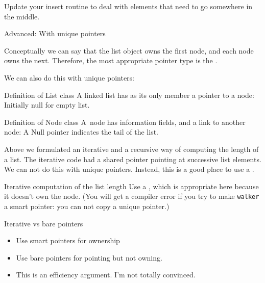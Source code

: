 \begin{exercise}
  \label{ex:linklist-insert-middle}
  Update your insert routine to deal with elements
  that need to go somewhere in the middle.
  
\end{exercise}


 {Advanced: With unique pointers}

Conceptually we can say
that the list object owns the first node, and each node owns the
next.
Therefore, the most appropriate pointer type is  the .

We can also do this with unique pointers:

\begin{block}{Definition of List class}
  \label{sl:list-class-u}
  A linked list has as its only member a pointer to a node:
  \lstset{numbers=left,numberstyle=\tiny}
  Initially null for empty list.
\end{block}

\begin{block}{Definition of Node class}
  \label{sl:node-class-u}
  A~node has information fields, and a
  link to another node:
  \lstset{numbers=left,numberstyle=\tiny}
  A Null pointer indicates the tail of the list.
\end{block}

Above we formulated an iterative and a recursive way of computing
the length of a list.
The iterative code had a shared pointer pointing at successive
list elements. We can not do this with unique pointers.
Instead, this is a good place to use a .

\begin{block}{Iterative computation of the list length}
  \label{sl:linkedlist-length-iter-u}
  Use a
  , which is appropriate here because it doesn't
  own the node.
  (You will get a compiler error if you try to make \lstinline{walker}
  a smart pointer: you can not copy a unique pointer.)
\end{block}

\begin{block}{Iterative vs bare pointers}
  \label{sl:bare-vs-smart}
  \begin{itemize}
  \item Use smart pointers for ownership
  \item Use bare pointers for pointing but not owning.
  \item This is an efficiency argument.\slidebreak
    I'm not totally convinced.
  \end{itemize}
\end{block}

